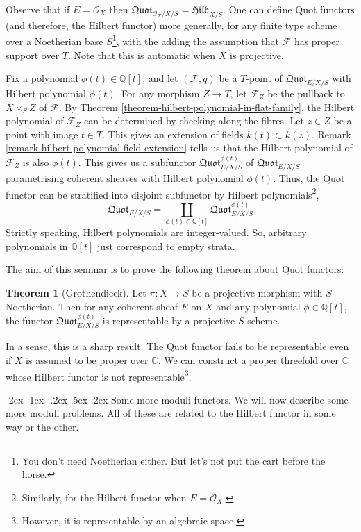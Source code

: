 \documentclass[11pt]{amsart}
\makeatletter
\renewcommand\subsection{\@startsection {subsection}{1}{\z@}%
	{-2ex \@plus -1ex \@minus -.2ex}%
	{.5ex \@plus.2ex}%
	{\normalfont\bfseries}}
\newcommand{\sF}{{\mathcal F}}
\newcommand{\sO}{{\mathcal O}}
\newcommand{\C}{{\mathbb C}}
\newcommand{\Q}{{\mathbb Q}}
\theoremstyle{definition}
\newtheorem{theorem}{Theorem}[section]
\makeatother
\begin{document}
Observe that if $E=\sO_X$ then $\mathfrak{Quot}_{\sO_X/X/S}=\mathfrak{Hilb}_{X/S}$. One can define Quot functors (and therefore, the Hilbert functor) more generally, for any finite type scheme over a Noetherian base $S$\footnote{You don't need Noetherian either. But let's not put the cart before the horse.}, with the adding the assumption that $\sF$ has proper support over $T$. Note that this is automatic when $X$ is projective.

Fix a polynomial $\phi(t)\in \Q[t]$, and let $(\sF,q)$ be a $T$-point of $\mathfrak{Quot}_{E/X/S}$ with Hilbert polynomial $\phi(t)$. For any morphism $Z\rightarrow T$, let $\sF_Z$ be the pullback to $X\times_S Z$ of $\sF$. By Theorem \ref{theorem-hilbert-polynomial-in-flat-family}, the Hilbert polynomial of $\sF_Z$ can be determined by checking along the fibres. Let $z\in Z$ be a point with image $t\in T$. This gives an extension of fields $k(t)\subset k(z)$. Remark \ref{remark-hilbert-polynomial-field-extension} tells us that the Hilbert polynomial of $\sF_Z$ is also $\phi(t)$. This gives us a subfunctor $\mathfrak{Quot}^{\phi(t)}_{E/X/S}$ of $\mathfrak{Quot}_{E/X/S}$ parametrising coherent sheaves with Hilbert polynomial $\phi(t)$. Thus, the Quot functor can be stratified into disjoint subfunctor by Hilbert polynomials\footnote{Similarly, for the Hilbert functor when $E=\sO_X$.},
\[\mathfrak{Quot}_{E/X/S}=\underset{\phi(t)\in \Q[t]}{\coprod} \mathfrak{Quot}^{\phi(t)}_{E/X/S}\]
Strictly speaking, Hilbert polynomials are integer-valued. So, arbitrary polynomials in $\Q[t]$ just correspond to empty strata.

The aim of this seminar is to prove the following theorem about Quot functors:

\begin{theorem}[Grothendieck]
	\label{theorem-quot-representable}
	Let $\pi: X\rightarrow S$ be a projective morphism with $S$ Noetherian. Then for any coherent sheaf $E$ on $X$ and any polynomial $\phi \in \Q[t]$, the functor $\mathfrak{Quot}^{\phi(t)}_{E/X/S}$ is representable by a projective $S$-scheme.
\end{theorem}

In a sense, this is a sharp result. The Quot functor fails to be representable even if $X$ is assumed to be proper over $\C$. We can construct a proper threefold over $\C$ whose Hilbert functor is not representable\footnote{However, it is representable by an algebraic space.}.

\subsection{Some more moduli functors.}
We will now describe some more moduli problems. All of these are related to the Hilbert functor in some way or the other.
\end{document}
